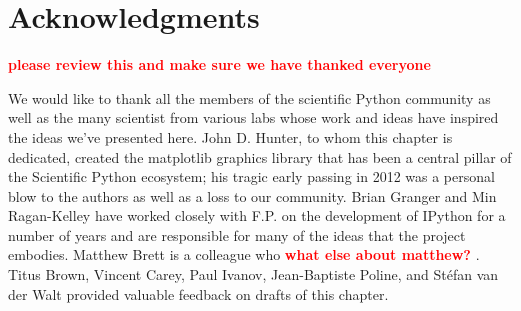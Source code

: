\documentclass[ChapterTOCs,krantz2]{krantz} %
\newcommand{\fix}[1] { \textcolor{red} {
{\fbox{ {\bf Fix:} \ensuremath{\blacktriangleright }} {\bf #1}
\fbox{\ensuremath{\blacktriangleleft} } } } }
\begin{document}
\section*{Acknowledgments}

\fix{please review this and make sure we have thanked everyone}

We would like to thank all the members of the scientific Python community as
well as the many scientist from various labs whose work and ideas have inspired
the ideas we've presented here.  John D. Hunter, to whom this chapter is
dedicated, created the matplotlib graphics library that has been a central
pillar of the Scientific Python ecosystem; his tragic early passing in 2012 was
a personal blow to the authors as well as a loss to our community.  Brian
Granger and Min Ragan-Kelley have worked closely with F.P. on the development
of IPython for a number of years and are responsible for many of the ideas that
the project embodies.  Matthew Brett is a colleague who \fix{what else about
  matthew?}.  Titus Brown, Vincent Carey, Paul Ivanov, Jean-Baptiste Poline,
and Stéfan van der Walt provided valuable feedback on drafts of this chapter.




\end{document}
